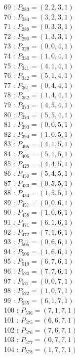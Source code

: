 \documentclass{article}
\begin{document}
{\begin{multicols}{3}
69 : $P_{283}=( 2, 2, 3, 1 )$\\
70 : $P_{284}=( 3, 2, 3, 1 )$\\
71 : $P_{289}=( 0, 3, 3, 1 )$\\
72 : $P_{290}=( 1, 3, 3, 1 )$\\
73 : $P_{329}=( 0, 0, 4, 1 )$\\
74 : $P_{330}=( 1, 0, 4, 1 )$\\
75 : $P_{341}=( 4, 1, 4, 1 )$\\
76 : $P_{342}=( 5, 1, 4, 1 )$\\
77 : $P_{361}=( 0, 4, 4, 1 )$\\
78 : $P_{362}=( 1, 4, 4, 1 )$\\
79 : $P_{373}=( 4, 5, 4, 1 )$\\
80 : $P_{374}=( 5, 5, 4, 1 )$\\
81 : $P_{393}=( 0, 0, 5, 1 )$\\
82 : $P_{394}=( 1, 0, 5, 1 )$\\
83 : $P_{405}=( 4, 1, 5, 1 )$\\
84 : $P_{406}=( 5, 1, 5, 1 )$\\
85 : $P_{429}=( 4, 4, 5, 1 )$\\
86 : $P_{430}=( 5, 4, 5, 1 )$\\
87 : $P_{433}=( 0, 5, 5, 1 )$\\
88 : $P_{434}=( 1, 5, 5, 1 )$\\
89 : $P_{457}=( 0, 0, 6, 1 )$\\
90 : $P_{458}=( 1, 0, 6, 1 )$\\
91 : $P_{471}=( 6, 1, 6, 1 )$\\
92 : $P_{472}=( 7, 1, 6, 1 )$\\
93 : $P_{505}=( 0, 6, 6, 1 )$\\
94 : $P_{506}=( 1, 6, 6, 1 )$\\
95 : $P_{519}=( 6, 7, 6, 1 )$\\
96 : $P_{520}=( 7, 7, 6, 1 )$\\
97 : $P_{521}=( 0, 0, 7, 1 )$\\
98 : $P_{522}=( 1, 0, 7, 1 )$\\
99 : $P_{535}=( 6, 1, 7, 1 )$\\
100 : $P_{536}=( 7, 1, 7, 1 )$\\
101 : $P_{575}=( 6, 6, 7, 1 )$\\
102 : $P_{576}=( 7, 6, 7, 1 )$\\
103 : $P_{577}=( 0, 7, 7, 1 )$\\
104 : $P_{578}=( 1, 7, 7, 1 )$\\
\end{multicols}


}
\end{document}
